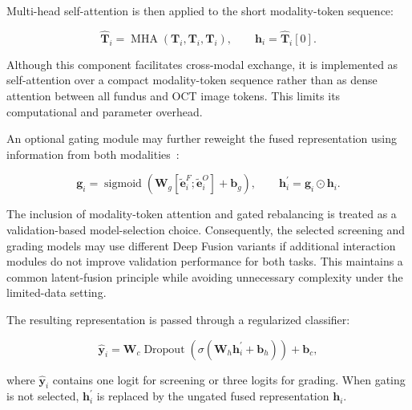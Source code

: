 \documentclass[preprint,12pt]{elsarticle}
\begin{document}
Multi-head self-attention is then applied to the short modality-token sequence:

\begin{equation}
    \hat{\mathbf{T}}_{i}
    =
    \operatorname{MHA}
    \left(
    \mathbf{T}_{i},
    \mathbf{T}_{i},
    \mathbf{T}_{i}
    \right),
    \qquad
    \mathbf{h}_{i}
    =
    \hat{\mathbf{T}}_{i}[0].
    \label{eq:deep_attention}
\end{equation}

Although this component facilitates cross-modal exchange, it is implemented as self-attention over a compact modality-token sequence rather than as dense attention between all fundus and OCT image tokens. This limits its computational and parameter overhead.

An optional gating module may further reweight the fused representation using information from both modalities~\cite{song2022cross}:

\begin{equation}
    \mathbf{g}_{i}
    =
    \operatorname{sigmoid}
    \left(
    \mathbf{W}_{g}
    \left[
        \tilde{\mathbf{e}}_{i}^{F};
        \tilde{\mathbf{e}}_{i}^{O}
        \right]
    +
    \mathbf{b}_{g}
    \right),
    \qquad
    \mathbf{h}_{i}^{\prime}
    =
    \mathbf{g}_{i}\odot\mathbf{h}_{i}.
    \label{eq:deep_gate}
\end{equation}

The inclusion of modality-token attention and gated rebalancing is treated as a validation-based model-selection choice. Consequently, the selected screening and grading models may use different Deep Fusion variants if additional interaction modules do not improve validation performance for both tasks. This maintains a common latent-fusion principle while avoiding unnecessary complexity under the limited-data setting.

The resulting representation is passed through a regularized classifier:

\begin{equation}
    \hat{\mathbf{y}}_{i}
    =
    \mathbf{W}_{c}
    \operatorname{Dropout}
    \left(
    \sigma\!\left(
        \mathbf{W}_{h}\mathbf{h}_{i}^{\prime}
        +
        \mathbf{b}_{h}
        \right)
    \right)
    +
    \mathbf{b}_{c},
    \label{eq:deep_classifier}
\end{equation}

where $\hat{\mathbf{y}}_{i}$ contains one logit for screening or three logits for grading. When gating is not selected, $\mathbf{h}_{i}^{\prime}$ is replaced by the ungated fused representation $\mathbf{h}_{i}$.
\end{document}
